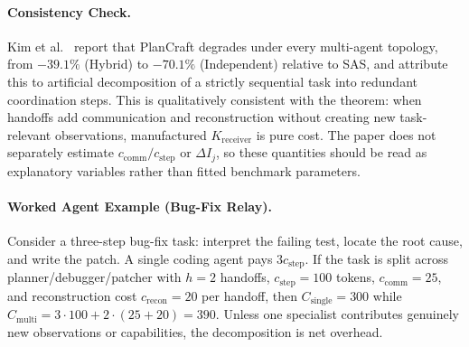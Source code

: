 \paragraph{Consistency Check.} Kim et al.~\cite{kim2025scaling} report that PlanCraft degrades under every multi-agent topology, from $-39.1\%$ (Hybrid) to $-70.1\%$ (Independent) relative to SAS, and attribute this to artificial decomposition of a strictly sequential task into redundant coordination steps. This is qualitatively consistent with the theorem: when handoffs add communication and reconstruction without creating new task-relevant observations, manufactured $K_{\mathrm{receiver}}$ is pure cost. The paper does not separately estimate $c_{\mathrm{comm}}/c_{\mathrm{step}}$ or $\Delta I_j$, so these quantities should be read as explanatory variables rather than fitted benchmark parameters.

\paragraph{Worked Agent Example (Bug-Fix Relay).}
Consider a three-step bug-fix task: interpret the failing test, locate the root cause, and write the patch. A single coding agent pays $3c_{\mathrm{step}}$. If the task is split across planner/debugger/patcher with $h=2$ handoffs, $c_{\mathrm{step}}=100$ tokens, $c_{\mathrm{comm}}=25$, and reconstruction cost $c_{\mathrm{recon}}=20$ per handoff, then $C_{\mathrm{single}}=300$ while $C_{\mathrm{multi}}=3\cdot100+2\cdot(25+20)=390$. Unless one specialist contributes genuinely new observations or capabilities, the decomposition is net overhead.

